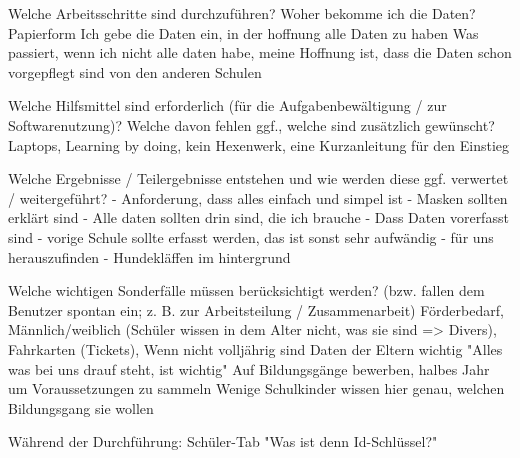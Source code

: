 Welche Arbeitsschritte sind durchzuführen?		
Woher bekomme ich die Daten? Papierform
Ich gebe die Daten ein, in der hoffnung alle Daten zu haben
Was passiert, wenn ich nicht alle daten habe, meine Hoffnung ist, dass die Daten schon vorgepflegt sind von den anderen Schulen				






Welche Hilfsmittel sind erforderlich (für die Aufgabenbewältigung / zur Softwarenutzung)? Welche davon fehlen ggf., welche sind zusätzlich gewünscht?
Laptops, 
Learning by doing, 
kein Hexenwerk, 
eine Kurzanleitung für den Einstieg	 	














Welche Ergebnisse / Teilergebnisse entstehen und wie werden diese ggf. verwertet / weitergeführt?		
- Anforderung, dass alles einfach und simpel ist
- Masken sollten erklärt sind
- Alle daten sollten drin sind, die ich brauche
- Dass Daten vorerfasst sind
- vorige Schule sollte erfasst werden, das ist sonst sehr aufwändig - für uns herauszufinden
- Hundekläffen im hintergrund			






Welche wichtigen Sonderfälle müssen berücksichtigt werden? (bzw. fallen dem Benutzer spontan ein; z. B. zur Arbeitsteilung / Zusammenarbeit)		
Förderbedarf, 
Männlich/weiblich (Schüler wissen in dem Alter nicht, was sie sind => Divers),
Fahrkarten (Tickets),
Wenn nicht volljährig sind Daten der Eltern wichtig
"Alles was bei uns drauf steht, ist wichtig"
Auf Bildungsgänge bewerben, halbes Jahr um Voraussetzungen zu sammeln
Wenige Schulkinder wissen hier genau, welchen Bildungsgang sie wollen
		






Während der Durchführung:						
Schüler-Tab
"Was ist denn Id-Schlüssel?"				





















